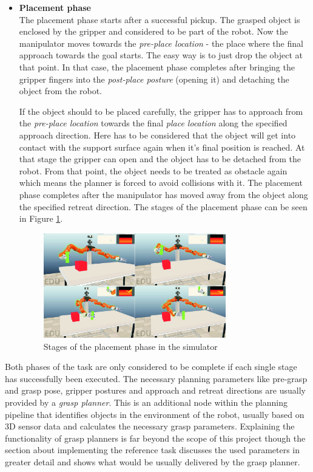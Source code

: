 \begin{itemize}
\item \textbf{Placement phase} \\

The placement phase starts after a successful pickup. The grasped object is enclosed by the gripper and considered to be part of the robot. Now the manipulator moves towards the \emph{pre-place location} - the place where the final approach towards the goal starts. The easy way is to just drop the object at that point. In that case, the placement phase completes after bringing the gripper fingers into the \emph{post-place posture} (opening it) and detaching the object from the robot.

If the object should to be placed carefully, the gripper has to approach from the \emph{pre-place location} towards the final \emph{place location} along the specified approach direction. Here has to be considered that the object will get into contact with the support surface again when it's final position is reached. At that stage the gripper can open and the object has to be detached from the robot. From that point, the object needs to be treated as obstacle again which means the planner is forced to avoid collisions with it. The placement phase completes after the manipulator has moved away from the object along the specified retreat direction. The stages of the placement phase can be seen in Figure \ref{fig:placement}.

\begin{figure}[ht]
	\centering
  	\includegraphics[width=0.75\textwidth]{images/placement.jpg}
	\caption{Stages of the placement phase in the simulator}
	\label{fig:placement}
\end{figure}

\end{itemize}

Both phases of the task are only considered to be complete if each single stage has successfully been executed. The necessary planning parameters like pre-grasp and grasp pose, gripper postures and approach and retreat directions are usually provided by a \emph{grasp planner}. This is an additional node within the planning pipeline that identifies objects in the environment of the robot, usually based on 3D sensor data and calculates the necessary grasp parameters. Explaining the functionality of grasp planners is far beyond the scope of this project though the section about implementing the reference task discusses the used parameters in greater detail and shows what would be usually delivered by the grasp planner.


